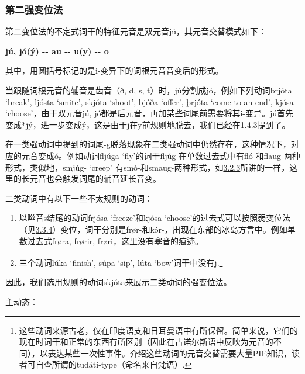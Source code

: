 \subsubsection{第二强变位法}\label{ux7b2cux4e8cux5f3aux53d8ux4f4dux6cd5}

第二变位法的不定式词干的特征元音是双元音jú，其元音交替模式如下：

\textbf{jú, jó(ý) -\/- au -\/- u(y) -\/- o}

其中，用圆括号标记的是i-变异下的词根元音音变后的形式。

当跟随词根元音的辅音是齿音（ð, d, s,
t）时，jú分割成jó，例如下列动词brjóta `break‌', ljósta `smite‌', skjóta
`shoot‌', bjóða `offer‌', þrjóta `come to an end‌', kjósa
`choose‌'，由于双元音jú,
jó都是后元音，再加某些词尾前需要将其i-变异。jú首先变成*jý，进一步变成ý，这是由于j在y前规则地脱去，我们已经在\hyperref[ux534aux5143ux97f3ux7684ux4fddux6301ux6027]{1.4.3}提到了。

在一类强动词中提到的词尾-g脱落现象在二类强动词中仍然存在，这种情况下，对应的元音变成ó。例如动词fljúga
`fly‌'的词干fljúg-在单数过去式中有fló-和flaug-两种形式，类似地，smjúg-
`creep‌'
有smó-和smaug-两种形式，如\hyperref[ux7b2cux4e00ux5f3aux53d8ux4f4dux6cd5]{3.2.3}所讲的一样，这里的长元音也会触发词尾的辅音延长音变。

二类动词中有以下一些不太规则的动词：

\begin{enumerate}
  \def\labelenumi{\arabic{enumi})}
  \item
        以咝音s结尾的动词frjósa `freeze‌'和kjósa
        `choose‌'的过去式可以按照弱变位法（见\hyperref[ux7b2cux4e8cux5f31ux53d8ux4f4dux6cd5]{3.3.4}）变位，词干分别是frør-和kór-，出现在东部的冰岛方言中。例如单数过去式frøra,
        frørir, frøri，这里没有塞音的痕迹。
  \item
        三个动词lúka `finish‌', súpa `sip‌', lúta `bow‌'词干中没有j.\footnote{这些动词来源古老，仅在印度语支和日耳曼语中有所保留。简单来说，它们的现在时词干和正常的东西有所区别（因此在古诺尔斯语中反映为元音的不同），以表达某些一次性事件。介绍这些动词的元音交替需要大量PIE知识，读者可自查所谓的tudáti-type（命名来自梵语）.}
\end{enumerate}

因此，我们选用规则的动词skjóta来展示二类动词的强变位法。

主动态：

